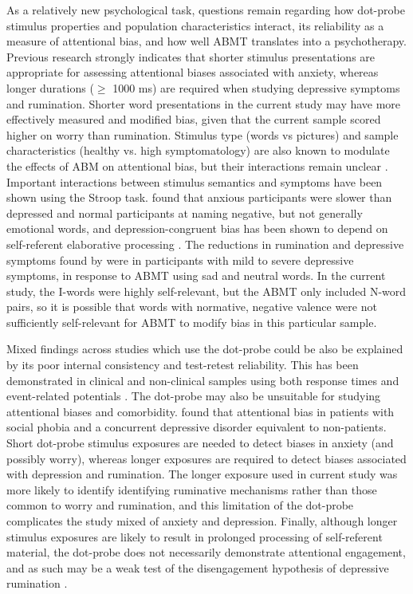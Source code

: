 \documentclass[man,floatsintext,a4paper,biblatex]{apa6}\usepackage[]{graphicx}\usepackage[]{color}
\begin{document}
As a relatively new psychological task, questions remain regarding
how dot-probe stimulus properties and population characteristics
interact, its reliability as a measure of attentional bias, and
how well ABMT translates into a psychotherapy. Previous research
\parencite{donaldson_rumination_2007,bradley_attentional_1997} strongly
indicates that shorter stimulus presentations are appropriate for
assessing attentional biases associated with anxiety, whereas longer
durations (${\geq}$ 1000 ms) are required when studying depressive
symptoms and rumination. Shorter word presentations in the current
study may have more effectively measured and modified bias, given that
the current sample scored higher on worry than rumination. Stimulus
type (words vs pictures) and sample characteristics (healthy
vs. high symptomatology) are also known to modulate the effects
of ABM on attentional bias, but their interactions remain unclear
\parencite{beard_efficacy_2012}. Important interactions between
stimulus semantics and symptoms have been shown using the Stroop task.
\textcite{mogg_subliminal_1993} found that anxious participants were
slower than depressed and normal participants at naming negative,
but not generally emotional words, and depression-congruent bias
has been shown to depend on self-referent elaborative processing
\parencite{nunn_selective_1997}. The reductions in rumination and
depressive symptoms found by \textcite{yang_attention_2015} were in
participants with mild to severe depressive symptoms, in response to
ABMT using sad and neutral words.  In the current study, the I-words were
highly self-relevant, but the ABMT only included N-word pairs, so it is
possible that words with normative, negative valence were not sufficiently
self-relevant for ABMT to modify bias in this particular sample.

Mixed findings across studies which use the dot-probe could
be also be explained by its poor internal consistency and
test-retest reliability. This has been demonstrated in
clinical and non-clinical samples using both response times
\parencite{schmukle_unreliability_2005} and event-related potentials
\parencite{kappenman_behavioral_2014}. The dot-probe may also be unsuitable for studying attentional biases
and comorbidity. \textcite{musa_selective_2003} found that attentional
bias in patients with social phobia and a concurrent depressive disorder
equivalent to non-patients. Short dot-probe stimulus exposures are
needed to detect biases in anxiety (and possibly worry), whereas longer
exposures are required to detect biases associated with depression and
rumination. The longer exposure used in current study was more likely to
identify identifying ruminative mechanisms rather than those common to
worry and rumination, and this limitation of the dot-probe complicates the
study mixed of anxiety and depression. Finally, although longer stimulus
exposures are likely to result in prolonged processing of self-referent
material, the dot-probe does not necessarily demonstrate attentional
engagement, and as such may be a weak test of the disengagement hypothesis
of depressive rumination \parencite{koster_understanding_2011}.
\end{document}
